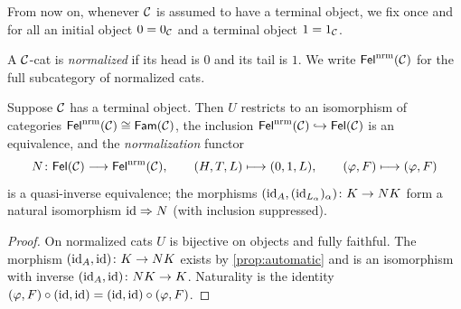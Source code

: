 \begin{assumption}\label{ass:normalized}
From now on, whenever $\mathcal{C}$ is assumed to have a terminal object, we fix once
and for all an initial object $0=0_{\mathcal{C}}$ and a terminal object $1=1_{\mathcal{C}}$.
\end{assumption}

\begin{definition}\label{def:normalized}
A $\mathcal{C}$-cat is \emph{normalized} if its head is $0$ and its tail is $1$. We
write $\mathsf{Fel}^{\mathrm{nrm}}(\mathcal{C})$ for the full subcategory of normalized cats.
\end{definition}

\begin{proposition}\label{prop:normalization}
Suppose $\mathcal{C}$ has a terminal object. Then $U$ restricts to an isomorphism of
categories $\mathsf{Fel}^{\mathrm{nrm}}(\mathcal{C})\cong\mathsf{Fam}(\mathcal{C})$, the inclusion
$\mathsf{Fel}^{\mathrm{nrm}}(\mathcal{C})\hookrightarrow\mathsf{Fel}(\mathcal{C})$ is an equivalence, and the
\emph{normalization} functor
\[
N\colon\mathsf{Fel}(\mathcal{C})\longrightarrow\mathsf{Fel}^{\mathrm{nrm}}(\mathcal{C}),\qquad (H,T,L)\longmapsto(0,1,L),\qquad(\varphi,F)\longmapsto(\varphi,F)
\]
is a quasi-inverse equivalence; the morphisms $(\mathrm{id}_A,(\mathrm{id}_{L_\alpha})_\alpha)\colon K\to NK$
form a natural isomorphism $\mathrm{id}\Rightarrow N$ (with inclusion suppressed).
\end{proposition}

\begin{proof}
On normalized cats $U$ is bijective on objects and fully faithful. The
morphism $(\mathrm{id}_A,\mathrm{id})\colon K\to NK$ exists by \cref{prop:automatic} and is
an isomorphism with inverse $(\mathrm{id}_A,\mathrm{id})\colon NK\to K$. Naturality is the
identity $(\varphi,F)\circ(\mathrm{id},\mathrm{id})=(\mathrm{id},\mathrm{id})\circ(\varphi,F)$.
\end{proof}

